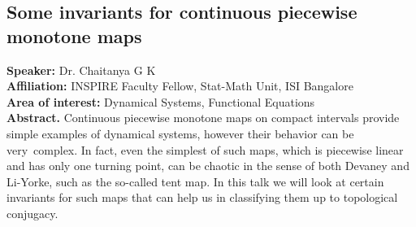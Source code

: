 \subsection*{Some invariants for continuous piecewise monotone maps} %
\noindent
\textbf{Speaker:} Dr. Chaitanya G K \\ %
\textbf{Affiliation:} INSPIRE Faculty Fellow, Stat-Math Unit, ISI Bangalore \\ %
\textbf{Area of interest:} Dynamical Systems, Functional Equations \\

\noindent\textbf{Abstract.} Continuous piecewise monotone maps on compact intervals provide simple examples of dynamical systems, however their behavior can be very complex. In fact, even the simplest of such maps, which is piecewise linear and has only one turning point,   can be chaotic in the sense of both Devaney and Li-Yorke, such as the so-called tent map. In this talk we will look at certain invariants for such maps that can help us in classifying them up to topological conjugacy. 


